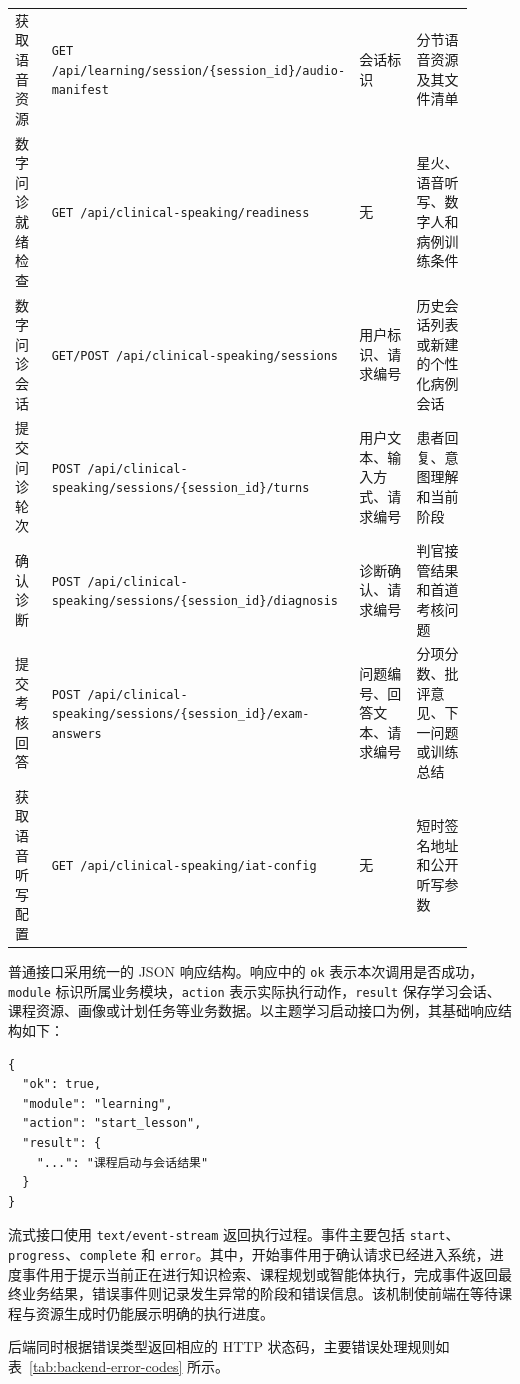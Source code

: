 {\begin{longtable}{
  p{0.14\linewidth}
  p{0.31\linewidth}
  p{0.23\linewidth}
  p{0.23\linewidth}
}
  获取语音资源
  & \texttt{GET /api/learning/session/\{session\_id\}/audio-manifest}
  & 会话标识
  & 分节语音资源及其文件清单 \\

  数字问诊就绪检查
  & \texttt{GET /api/clinical-speaking/readiness}
  & 无
  & 星火、语音听写、数字人和病例训练条件 \\

  数字问诊会话
  & \texttt{GET/POST /api/clinical-speaking/sessions}
  & 用户标识、请求编号
  & 历史会话列表或新建的个性化病例会话 \\

  提交问诊轮次
  & \texttt{POST /api/clinical-speaking/sessions/\{session\_id\}/turns}
  & 用户文本、输入方式、请求编号
  & 患者回复、意图理解和当前阶段 \\

  确认诊断
  & \texttt{POST /api/clinical-speaking/sessions/\{session\_id\}/diagnosis}
  & 诊断确认、请求编号
  & 判官接管结果和首道考核问题 \\

  提交考核回答
  & \texttt{POST /api/clinical-speaking/sessions/\{session\_id\}/exam-answers}
  & 问题编号、回答文本、请求编号
  & 分项分数、批评意见、下一问题或训练总结 \\

  获取语音听写配置
  & \texttt{GET /api/clinical-speaking/iat-config}
  & 无
  & 短时签名地址和公开听写参数 \\
  \end{longtable}
}

普通接口采用统一的 JSON 响应结构。响应中的 \texttt{ok} 表示本次调用是否成功，\texttt{module} 标识所属业务模块，\texttt{action} 表示实际执行动作，\texttt{result} 保存学习会话、课程资源、画像或计划任务等业务数据。以主题学习启动接口为例，其基础响应结构如下：

\begin{lstlisting}
{
  "ok": true,
  "module": "learning",
  "action": "start_lesson",
  "result": {
    "...": "课程启动与会话结果"
  }
}
\end{lstlisting}

流式接口使用 \texttt{text/event-stream} 返回执行过程。事件主要包括 \texttt{start}、\texttt{progress}、\texttt{complete} 和 \texttt{error}。其中，开始事件用于确认请求已经进入系统，进度事件用于提示当前正在进行知识检索、课程规划或智能体执行，完成事件返回最终业务结果，错误事件则记录发生异常的阶段和错误信息。该机制使前端在等待课程与资源生成时仍能展示明确的执行进度。

后端同时根据错误类型返回相应的 HTTP 状态码，主要错误处理规则如表~\ref{tab:backend-error-codes} 所示。

